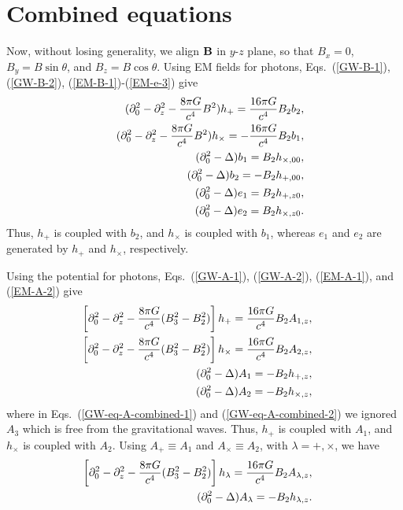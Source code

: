 \documentclass[twocolumn,amsmath,amssymb]{revtex4}
\newcommand{\bea}{\begin{eqnarray}}
\newcommand{\eea}{\end{eqnarray}}
\begin{document}
\section{Combined equations}
                                        \label{sec:combined}

Now, without losing generality, we align ${\bf B}$ in $y$-$z$ plane, so that $B_x = 0$, $B_y = B \sin{\theta}$, and $B_z = B \cos{\theta}$. Using EM fields for photons, Eqs.\ (\ref{GW-B-1}), (\ref{GW-B-2}), (\ref{EM-B-1})-(\ref{EM-e-3}) give
\bea
   & & ( \partial_0^2 - \partial_z^2
       - {8 \pi G \over c^4} B^2
       ) h_+
       = {16 \pi G \over c^4} B_2 b_2,
   \label{h-b-1} \\
   & & ( \partial_0^2 - \partial_z^2
       - {8 \pi G \over c^4} B^2
       ) h_\times
       = - {16 \pi G \over c^4} B_2 b_1,
   \label{h-b-2} \\
   & & ( \partial_0^2 - \Delta ) b_1
       = B_2 h_{\times,00},
   \label{h-b-3} \\
   & & ( \partial_0^2 - \Delta ) b_2
       = - B_2 h_{+,00},
   \label{h-b-4} \\
   & & ( \partial_0^2 - \Delta ) e_1
       = B_2 h_{+,z0},
   \label{h-b-5} \\
   & & ( \partial_0^2 - \Delta ) e_2
       = B_2 h_{\times,z0}.
   \label{h-b-6}
\eea
Thus, $h_+$ is coupled with $b_2$, and $h_\times$ is coupled with $b_1$, whereas $e_1$ and $e_2$ are generated by $h_+$ and $h_\times$, respectively.

Using the potential for photons, Eqs.\ (\ref{GW-A-1}), (\ref{GW-A-2}), (\ref{EM-A-1}), and (\ref{EM-A-2}) give
\bea
   & & \hskip -.8cm
       \left[ \partial_0^2 - \partial_z^2
       - {8 \pi G \over c^4} ( B_3^2 - B_2^2 )
       \right] h_+
       = {16 \pi G \over c^4} B_2 A_{1,z},
   \label{GW-eq-A-combined-1} \\
   & & \hskip -.8cm
       \left[ \partial_0^2 - \partial_z^2
       - {8 \pi G \over c^4} ( B_3^2 - B_2^2 )
       \right] h_\times
       = {16 \pi G \over c^4} B_2 A_{2,z},
   \label{GW-eq-A-combined-2} \\
   & & \hskip -.8cm
       ( \partial_0^2 - \Delta ) A_1
       = - B_2 h_{+,z},
   \\
   & & \hskip -.8cm
       ( \partial_0^2 - \Delta ) A_2
       = - B_2 h_{\times,z},
\eea
where in Eqs.\ (\ref{GW-eq-A-combined-1}) and (\ref{GW-eq-A-combined-2}) we ignored $A_3$ which is free from the gravitational waves. Thus, $h_+$ is coupled with $A_1$, and $h_\times$ is coupled with $A_2$. Using $A_+ \equiv A_1$ and $A_\times \equiv A_2$, with $\lambda = +, \times$, we have
\bea
   & & \hskip -.8cm
       \left[ \partial_0^2 - \partial_z^2
       - {8 \pi G \over c^4} ( B_3^2 - B_2^2 )
       \right] h_\lambda
       = {16 \pi G \over c^4} B_2 A_{\lambda,z},
   \label{h-A-lambda-1} \\
   & & \hskip -.8cm
       ( \partial_0^2 - \Delta ) A_\lambda
       = - B_2 h_{\lambda,z}.
   \label{h-A-lambda-2}
\eea
\end{document}
